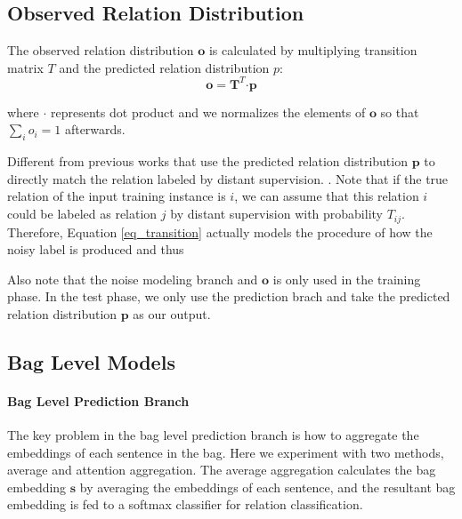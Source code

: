 \subsection{Observed Relation Distribution}
The observed relation distribution $\mathbf{o}$ is calculated by multiplying transition matrix $T$ and the predicted relation distribution $p$:
 \begin{equation}
\mathbf{o} = \mathbf{T}^T \bm\cdot \mathbf{p}
\label{eq_transition}
 \end{equation}

 where $\bm\cdot$ represents dot product and we normalizes the elements of $\mathbf{o}$ so that $\sum_i{o_i}=1$ afterwards.

Different from previous works that use the predicted relation distribution $\mathbf{p}$ to directly match the relation labeled by distant supervision. . Note that if the true relation of the input training instance is $i$, we can assume that this relation $i$ could be labeled as relation $j$ by distant supervision with probability $T_{ij}$. Therefore, Equation \ref{eq_transition} actually models the procedure of how the noisy label is produced and thus 

Also note that the noise modeling branch and $\mathbf{o}$ is only used in the training phase. In the test phase, we only use the prediction brach and take the predicted relation distribution $\mathbf{p}$ as our output. 

\subsection{Bag Level Models}
\paragraph{Bag Level Prediction Branch}
The key problem in the bag level prediction branch is how to aggregate the embeddings of each sentence in the bag. Here we experiment with two methods, average and attention aggregation. The average aggregation calculates the bag embedding $\mathbf{s}$ by averaging the embeddings of each sentence, and the resultant bag embedding is fed to a softmax classifier for relation classification.

